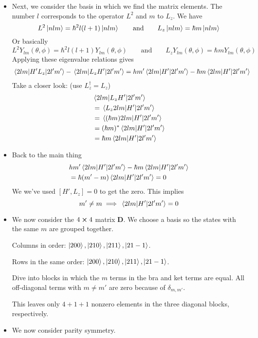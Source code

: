 \documentclass[11pt, a4paper]{article}
\newcommand{\eqtext}[1]{\qquad \text{#1} \qquad}
\newcommand{\mat}[1]{\mathbf{#1}} %
\begin{document}
\begin{itemize}
	\item Next, we consider the basis in which we find the matrix elements. The number $ l $ corresponds to the operator $ L^{2} $ and $ m $ to $ L_{z} $. We have
	\begin{equation*}
		L^{2}\ket{nlm} = \hbar^{2} l (l+1)\ket{nlm} \eqtext{and} L_{z}\ket{nlm} = \hbar m\ket{nlm}
	\end{equation*}
	Or basically
	\begin{equation*}
		L^{2}Y_{lm}(\theta, \phi) =  \hbar^{2} l (l+1)Y_{lm}(\theta, \phi) \eqtext{and} L_{z}Y_{lm}(\theta, \phi) =  \hbar m Y_{lm}(\theta, \phi)
	\end{equation*}
	Applying these eigenvalue relations gives
	\begin{align*}
		& \mel{2lm}{H'L_{z}}{2l'm'} - \mel{2lm}{L_{z}H'}{2l'm'} = hm'\mel{2lm}{H'}{2l'm'} - \hbar m \mel{2lm}{H'}{2l'm'}
	\end{align*}
	Take a closer look: (use $ L_{z}^{\dagger} = L_{z} $)
	\begin{align*}
		&\mel{2lm}{L_{z}H'}{2l'm'} \\
		& = \mel{L_{z}2lm}{H'}{2l'm'} \\
		&= \mel{(\hbar m)2lm}{H'}{2l'm'}\\
		& = (\hbar m)^{*}\mel{2lm}{H'}{2l'm'}\\
		& = \hbar m \mel{2lm}{H'}{2l'm'}
	\end{align*}
	
	\item Back to the main thing
	\begin{align*}
		 & hm'\mel{2lm}{H'}{2l'm'} - \hbar m \mel{2lm}{H'}{2l'm'}\\
		 & = \hbar(m' - m)\mel{2lm}{H'}{2l'm'} = 0
	\end{align*}
	We we've used $ [H', L_{z}] = 0 $ to get the zero. This implies 
	\begin{equation*}
		m' \neq m \implies \mel{2lm}{H'}{2l'm'} = 0
	\end{equation*}
	
	\item We now consider the $ 4 \cross 4 $ matrix $ \mat{D} $. We choose a basis so the states with the same $ m $ are grouped together. 
	
	Columns in order: $ \ket{200}, \ket{210}, \ket{211}, \ket{21-1} $. 
	
	Rows in the same order: $ \ket{200}, \ket{210}, \ket{211}, \ket{21-1} $. 
	
	Dive into blocks in which the $ m $ terms in the bra and ket terms are equal. All off-diagonal terms with $ m \neq m' $ are zero because of $ \delta_{m, m'} $. 
	
	This leaves only $ 4 + 1 + 1 $  nonzero elements in the three diagonal blocks, respectively.
	
	\item We now consider parity symmetry.
\end{itemize}
\end{document}
